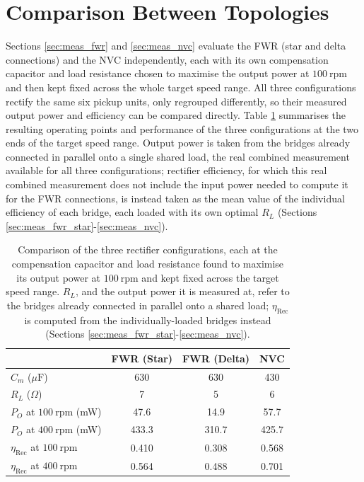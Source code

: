 \section{Comparison Between Topologies}
\label{sec:meas_comparison}

Sections \ref{sec:meas_fwr} and \ref{sec:meas_nvc} evaluate the FWR (star and delta connections) and the NVC independently, each with its own compensation capacitor and load resistance chosen to maximise the output power at $100\ \text{rpm}$ and then kept fixed across the whole target speed range. All three configurations rectify the same six pickup units, only regrouped differently, so their measured output power and efficiency can be compared directly. Table \ref{tab:meas_comparison} summarises the resulting operating points and performance of the three configurations at the two ends of the target speed range. Output power is taken from the bridges already connected in parallel onto a single shared load, the real combined measurement available for all three configurations; rectifier efficiency, for which this real combined measurement does not include the input power needed to compute it for the FWR connections, is instead taken as the mean value of the individual efficiency of each bridge, each loaded with its own optimal $R_L$ (Sections \ref{sec:meas_fwr_star}-\ref{sec:meas_nvc}).

\begin{table}[htbp]
    \centering
    \begin{tabular}{lccc}
        \toprule
        & FWR (Star) & FWR (Delta) & NVC \\
        \midrule
        $C_m$ ($\mu\text{F}$) & 630 & 630 & 430 \\
        $R_L$ ($\Omega$) & 7 & 5 & 6 \\
        $P_O$ at $100\ \text{rpm}$ (mW) & 47.6 & 14.9 & 57.7 \\
        $P_O$ at $400\ \text{rpm}$ (mW) & 433.3 & 310.7 & 425.7 \\
        $\eta_\text{Rec}$ at $100\ \text{rpm}$ & 0.410 & 0.308 & 0.568 \\
        $\eta_\text{Rec}$ at $400\ \text{rpm}$ & 0.564 & 0.488 & 0.701 \\
        \bottomrule
    \end{tabular}
    \caption{Comparison of the three rectifier configurations, each at the compensation capacitor and load resistance found to maximise its output power at $100\ \text{rpm}$ and kept fixed across the target speed range. $R_L$, and the output power it is measured at, refer to the bridges already connected in parallel onto a shared load; $\eta_\text{Rec}$ is computed from the individually-loaded bridges instead (Sections \ref{sec:meas_fwr_star}-\ref{sec:meas_nvc}).}
    \label{tab:meas_comparison}
\end{table}

